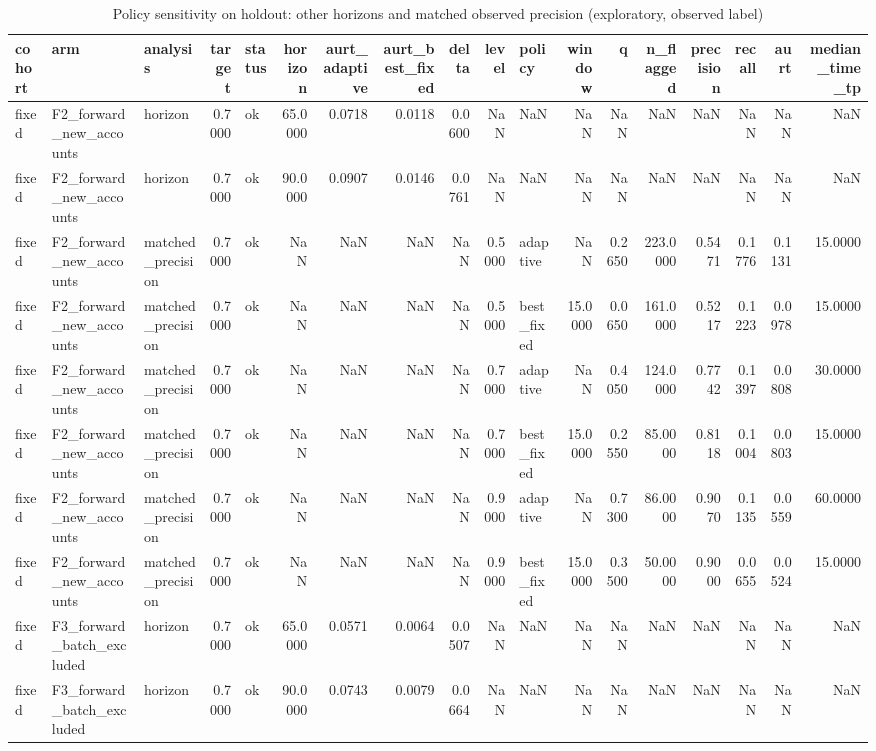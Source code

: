\begin{table}
\caption{Policy sensitivity on holdout: other horizons and matched observed precision (exploratory, observed label)}
\label{tab:tab_policy_sensitivity_final}
\begin{tabular}{lllrlrrrrrlrrrrrrr}
\toprule
cohort & arm & analysis & target & status & horizon & aurt\_adaptive & aurt\_best\_fixed & delta & level & policy & window & q & n\_flagged & precision & recall & aurt & median\_time\_tp \\
\midrule
fixed & F2\_forward\_new\_accounts & horizon & 0.7000 & ok & 65.0000 & 0.0718 & 0.0118 & 0.0600 & NaN & NaN & NaN & NaN & NaN & NaN & NaN & NaN & NaN \\
fixed & F2\_forward\_new\_accounts & horizon & 0.7000 & ok & 90.0000 & 0.0907 & 0.0146 & 0.0761 & NaN & NaN & NaN & NaN & NaN & NaN & NaN & NaN & NaN \\
fixed & F2\_forward\_new\_accounts & matched\_precision & 0.7000 & ok & NaN & NaN & NaN & NaN & 0.5000 & adaptive & NaN & 0.2650 & 223.0000 & 0.5471 & 0.1776 & 0.1131 & 15.0000 \\
fixed & F2\_forward\_new\_accounts & matched\_precision & 0.7000 & ok & NaN & NaN & NaN & NaN & 0.5000 & best\_fixed & 15.0000 & 0.0650 & 161.0000 & 0.5217 & 0.1223 & 0.0978 & 15.0000 \\
fixed & F2\_forward\_new\_accounts & matched\_precision & 0.7000 & ok & NaN & NaN & NaN & NaN & 0.7000 & adaptive & NaN & 0.4050 & 124.0000 & 0.7742 & 0.1397 & 0.0808 & 30.0000 \\
fixed & F2\_forward\_new\_accounts & matched\_precision & 0.7000 & ok & NaN & NaN & NaN & NaN & 0.7000 & best\_fixed & 15.0000 & 0.2550 & 85.0000 & 0.8118 & 0.1004 & 0.0803 & 15.0000 \\
fixed & F2\_forward\_new\_accounts & matched\_precision & 0.7000 & ok & NaN & NaN & NaN & NaN & 0.9000 & adaptive & NaN & 0.7300 & 86.0000 & 0.9070 & 0.1135 & 0.0559 & 60.0000 \\
fixed & F2\_forward\_new\_accounts & matched\_precision & 0.7000 & ok & NaN & NaN & NaN & NaN & 0.9000 & best\_fixed & 15.0000 & 0.3500 & 50.0000 & 0.9000 & 0.0655 & 0.0524 & 15.0000 \\
fixed & F3\_forward\_batch\_excluded & horizon & 0.7000 & ok & 65.0000 & 0.0571 & 0.0064 & 0.0507 & NaN & NaN & NaN & NaN & NaN & NaN & NaN & NaN & NaN \\
fixed & F3\_forward\_batch\_excluded & horizon & 0.7000 & ok & 90.0000 & 0.0743 & 0.0079 & 0.0664 & NaN & NaN & NaN & NaN & NaN & NaN & NaN & NaN & NaN \\

\end{tabular}
\end{table}
